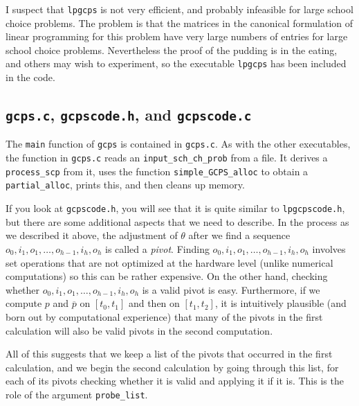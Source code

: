 \documentclass[12pt]{article}
\theoremstyle{definition}
\newcommand{\barp}{\overline{p}}
\begin{document}
\begin{appendix}
I suspect that \texttt{lpgcps} is not very efficient, and probably
infeasible for large school choice problems.  The problem is that the
matrices in the canonical formulation of linear programming for this
problem have very large numbers of entries for large school choice
problems.  Nevertheless the proof of the pudding is in the eating, and
others may wish to experiment, so the executable \texttt{lpgcps} has
been included in the code.

\subsection{\texttt{gcps.c}, \texttt{gcpscode.h}, and \texttt{gcpscode.c}} \label{sec:GcpsTop}

The \texttt{main} function of \texttt{gcps} is contained in
\texttt{gcps.c}.  As with the other executables, the 
function in \texttt{gcps.c} reads an \texttt{input\_sch\_ch\_prob}
from a file.  It derives a \texttt{process\_scp} from it, uses the
function \texttt{simple\_GCPS\_alloc} to obtain a
\texttt{partial\_alloc}, prints this, and then cleans up memory.

If you look at \texttt{gcpscode.h}, you will see that it is quite
similar to \texttt{lpgcpscode.h}, but there are some additional
aspects that we need to describe.  In the process as we described it
above, the adjustment of $\theta$ after we find a sequence
$o_0,i_1,o_1, \ldots, o_{h-1},i_h, o_h$ is called a \emph{pivot}.
Finding $o_0,i_1,o_1, \ldots, o_{h-1},i_h, o_h$ involves set
operations that are not optimized at the hardware level (unlike
numerical computations) so this can be rather expensive.  On the other
hand, checking whether $o_0,i_1,o_1, \ldots, o_{h-1},i_h, o_h$ is a
valid pivot is easy.  Furthermore, if we compute $p$ and $\barp$ on
$[t_0,t_1]$ and then on $[t_1,t_2]$, it is intuitively plausible (and
born out by computational experience) that many of the pivots in the
first calculation will also be valid pivots in the second computation.

All of this suggests that we keep a list of the pivots that occurred
in the first calculation, and we begin the second calculation by going
through this list, for each of its pivots checking whether it is valid
and applying it if it is.  This is the role of the argument \texttt{probe\_list}.


\end{appendix}
\end{document}
